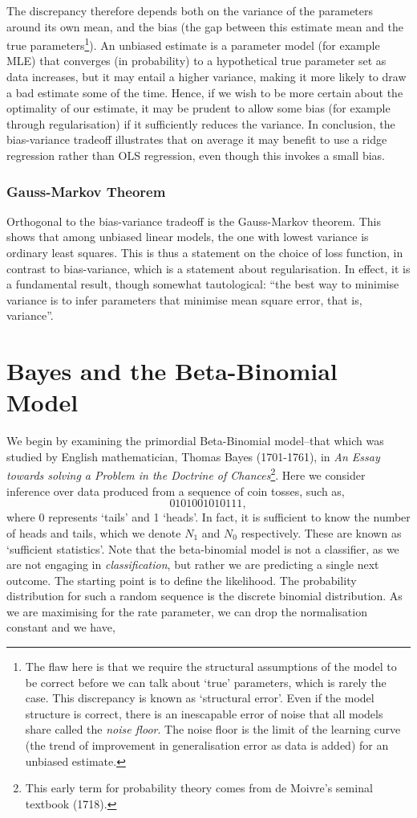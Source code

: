 \documentclass[11pt]{amsart}
\begin{document}
The discrepancy therefore depends both on the variance of the parameters around its own mean, and the bias (the gap between this estimate mean and the true parameters\footnote{The flaw here is that we require the structural assumptions of the model to be correct before we can talk about `true' parameters, which is rarely the case. This discrepancy is known as `structural error'. Even if the model structure is correct, there is an inescapable error of noise that all models share called the \emph{noise floor}. The noise floor is the limit of the learning curve (the trend of improvement in generalisation error as data is added) for an unbiased estimate.}). An unbiased estimate is a parameter model (for example MLE) that converges (in probability) to a hypothetical true parameter set as data increases, but it may entail a higher variance, making it more likely to draw a bad estimate some of the time. Hence, if we wish to be more certain about the optimality of our estimate, it may be prudent to allow some bias (for example through regularisation) if it sufficiently reduces the variance. In conclusion, the bias-variance tradeoff illustrates that on average it may benefit to use a ridge regression rather than OLS regression, even though this invokes a small bias.

\subsubsection{Gauss-Markov Theorem}

Orthogonal to the bias-variance tradeoff is the Gauss-Markov theorem. This shows that among unbiased linear models, the one with lowest variance is ordinary least squares. This is thus a statement on the choice of loss function, in contrast to bias-variance, which is a statement about regularisation. In effect, it is a fundamental result, though somewhat tautological: ``the best way to minimise variance is to infer parameters that minimise mean square error, that is, variance''.

\section{Bayes and the Beta-Binomial Model}

We begin by examining the primordial Beta-Binomial model--that which was studied by English mathematician, Thomas Bayes (1701-1761), in \emph{An Essay towards solving a Problem in the Doctrine of Chances}\footnote{This early term for probability theory comes from de Moivre's seminal textbook (1718).}. Here we consider inference over data produced from a sequence of coin tosses, such as, $$0101001010111,$$ where $0$ represents `tails' and 1 `heads'. In fact, it is sufficient to know the number of heads and tails, which we denote $N_1$ and $N_0$ respectively. These are known as `sufficient statistics'. Note that the beta-binomial model is not a classifier, as we are not engaging in \emph{classification}, but rather we are predicting a single next outcome. The starting point is to define the likelihood. The probability distribution for such a random sequence is the discrete binomial distribution. As we are maximising for the rate parameter, we can drop the normalisation constant and we have,
\end{document}
